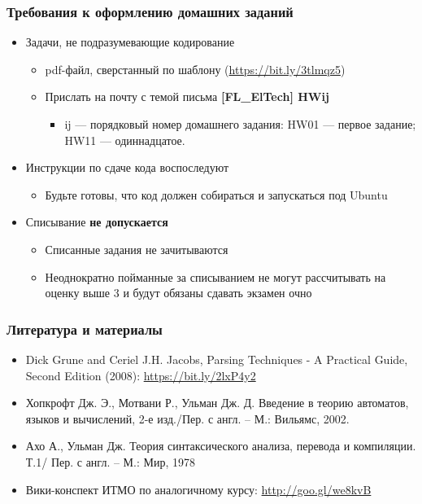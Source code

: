 \documentclass{beamer}
\begin{document}
\begin{frame}[fragile]
  \transwipe[direction=90]
  \frametitle{Требования к оформлению домашних заданий}
  \begin{itemize}
    \item Задачи, не подразумевающие кодирование
    \begin{itemize}
      \item pdf-файл, сверстанный по
шаблону (\url{https://bit.ly/3tlmqz5})
      \item Прислать на почту с темой письма \textbf{[FL\_ElTech] HWij}
      \begin{itemize}
        \item ij --- порядковый номер домашнего задания: HW01 --- первое задание; HW11 --- одиннадцатое.
      \end{itemize}
    \end{itemize}
    \item Инструкции по сдаче кода воспоследуют
    \begin{itemize}
      \item Будьте готовы, что код должен собираться и запускаться под Ubuntu
    \end{itemize}
    \item Списывание \textbf{не допускается}
    \begin{itemize}
      \item Списанные задания не зачитываются
      \item Неоднократно пойманные за списыванием не могут рассчитывать на оценку выше 3 и будут обязаны сдавать экзамен очно
    \end{itemize}
  \end{itemize}
\end{frame}

\begin{frame}[fragile]
  \transwipe[direction=90]
  \frametitle{Литература и материалы}
  \begin{itemize}
    \item Dick Grune and Ceriel J.H. Jacobs, Parsing Techniques - A Practical Guide, Second Edition (2008): \url{https://bit.ly/2lxP4y2}
    \item Хопкрофт Дж. Э., Мотвани Р., Ульман Дж. Д. Введение в теорию автоматов, языков и вычислений, 2-е изд./Пер. с англ. – М.: Вильямс, 2002.
    \item Ахо А., Ульман Дж. Теория синтаксического анализа, перевода и компиляции. Т.1/ Пер. с англ. – М.: Мир, 1978
    \item Вики-конспект ИТМО по аналогичному курсу: \url{http://goo.gl/we8kvB}
  \end{itemize}
\end{frame}
\end{document}
